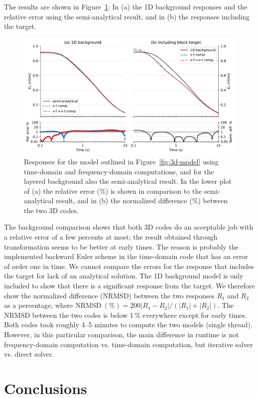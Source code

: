 \documentclass[extra, camera,%
]{gji}
\newlength{\fwidth}
\newcommand{\mr}[1]{\mathrm{#1}}
\begin{document}
The results are shown in Figure~\ref{fig:3d-result}: In (a) the 1D background
responses and the relative error using the semi-analytical result, and in (b)
the responses including the target.
%
\begin{figure}
  \centering
  \includegraphics[width=\fwidth]{10-3d-result}
  \caption{Responses for the model outlined in Figure~\ref{fig:3d-model} using
    time-domain and frequency-domain computations, and for the layered
    background also the semi-analytical result. In the lower plot of (a) the
    relative error (\%) is shown in comparison to the semi-analytical result,
    and in (b) the normalized difference (\%) between the two 3D codes.
    }
  \label{fig:3d-result}
\end{figure}
%
The background comparison shows that both 3D codes do an acceptable job with a
relative error of a few percents at most; the result obtained through
transformation seems to be better at early times. The reason is probably the
implemented backward Euler scheme in the time-domain code that has an error of
order one in time. We cannot compare the errors for the response that includes
the target for lack of an analytical solution. The 1D background model is only
included to show that there is a significant response from the target. We
therefore show the normalized difference (NRMSD) between the two responses
$R_1$ and $R_2$ as a percentage, where $\mr{NRMSD~(\%)} = 200|R_1 - R_2|/(|R_1|
+ |R_2|)$. The NRMSD between the two codes is below 1\,\% everywhere except for
early times. Both codes took roughly 4--5 minutes to compute the two models
(single thread). However, in this particular comparison, the main difference in
runtime is not frequency-domain computation vs. time-domain computation, but
iterative solver vs. direct solver.


\section{Conclusions} %
\end{document}
